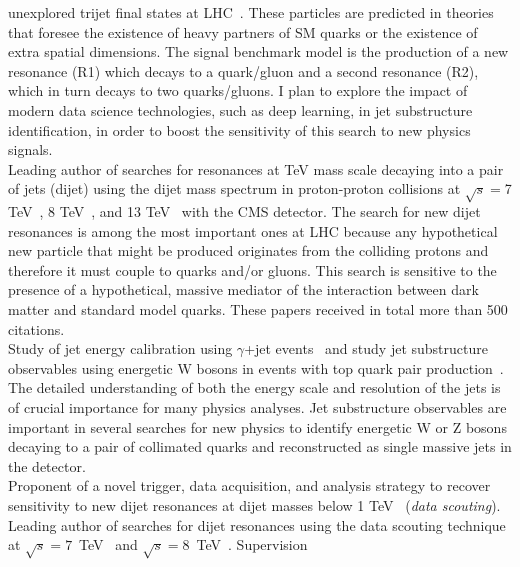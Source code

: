 \documentclass[10pt, a4paper]{article}
\newcommand{\years}[1]{\marginnote{\hskip-0.2in{\scriptsize #1}}}
\begin{document}
unexplored trijet final states at LHC~\cite{AN-19-273}. These
particles are predicted in theories that foresee the existence of
heavy partners of SM quarks or the existence of extra spatial
dimensions. The signal benchmark model is the production of a new resonance (R1)
which decays to a quark/gluon and a second resonance (R2), which in
turn decays to two quarks/gluons. I plan to explore the impact of
modern data science technologies, such as deep learning, in jet substructure identification, in order to boost the sensitivity of this search to new physics signals.\\ [1em] 
\years{09/2011 - 09/2018}Leading author of searches for resonances at
TeV mass scale decaying into a pair of jets (dijet) using the dijet mass spectrum 
in proton-proton collisions at $\sqrt{s}=$7 TeV~\cite{CMS:2012yf,AN-12-012}, 8
TeV~\cite{Chatrchyan:2013qha,AN-12-229,Khachatryan:2015sja,AN-12-455},
and 13 TeV~\cite{Sirunyan:2016iap,AN-16-202,Khachatryan:2015dcf,AN-15-063,AN-15-175} with the CMS
detector. The search for new dijet resonances is among the most important ones at LHC because any hypothetical new
particle that might be produced originates from the colliding protons
and therefore it must couple to quarks and/or gluons. This search is
sensitive to the presence of a hypothetical, massive  mediator of the interaction between dark matter and
standard model quarks. These papers received in total more than 500 citations.\\ [1em] 
\years{01/2015 - 09/2018}Study of jet energy calibration using $\gamma$+jet events~\cite{AN-16-344} and
study jet substructure observables using energetic W bosons in events with
top quark pair production~\cite{AN-17-051}. The detailed understanding of both 
the energy scale and resolution of the jets is of crucial importance
for many physics analyses. Jet substructure observables are important 
in several searches for new physics to identify energetic W or Z bosons decaying to 
a pair of collimated quarks and reconstructed as single massive jets
in the detector. \\ [1em] 
\years{09/2011 - 09/2018}
Proponent of a novel trigger, data acquisition, and analysis
strategy to recover sensitivity to new dijet resonances at dijet
masses below 1 TeV~\cite{CMS-DP-2012-022} ({\it data scouting}).
Leading author of searches for dijet resonances using the data
scouting technique at $\sqrt{s}=7$~TeV~\cite{CMS-PAS-EXO-11-094} 
and $\sqrt{s}=8$~TeV~\cite{Khachatryan:2016ecr,AN-14-104}. Supervision
\end{document}
